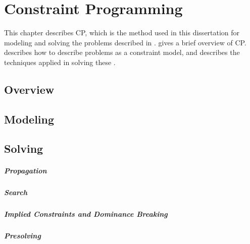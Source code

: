 %

\chapter{Constraint Programming}

This chapter describes \glsdesc{CP}, which is the method used in this
dissertation for modeling and solving the problems described in
.
%
 gives a brief overview of \gls{CP}.
%
 describes how to describe problems as a \gls{constraint
  model}, and  describes the techniques applied in
solving these .



\section{Overview}





\section{Modeling}




\section{Solving}




\paragraph{Propagation}




\paragraph{Search}




\paragraph{Implied Constraints and Dominance Breaking}




\paragraph{Presolving}

